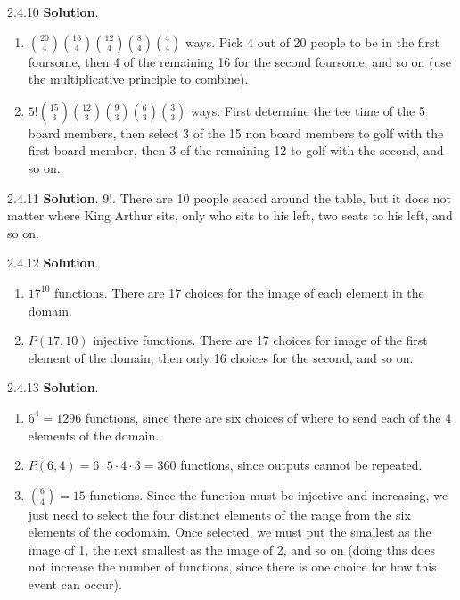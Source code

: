 \documentclass[11pt,]{book}
\theoremstyle{ptxplainnotitle}
\theoremstyle{ptxplaintitle}
\theoremstyle{ptxdefinitionnotitle}
\theoremstyle{ptxdefinitiontitle}
\theoremstyle{ptxdefinitionnotitle}
\theoremstyle{ptxdefinitiontitle}
\theoremstyle{ptxdefinitionnotitle}
\theoremstyle{ptxdefinitiontitle}
\theoremstyle{ptxdefinitiontitlenonumber}
\theoremstyle{ptxdefinitiontitlenonumber}
\numberwithin{equation}{chapter}
\begin{document}
\begin{divisionexercise}{2.4.10}
\textbf{Solution}.\quad%
\hypertarget{p-1595}{}%
\leavevmode%
\begin{enumerate}[label=\alph*.]
\item\hypertarget{li-669}{}\hypertarget{p-1596}{}%
\({20 \choose 4}{16 \choose 4}{12 \choose 4}{8 \choose 4}{4 \choose 4}\) ways. Pick 4 out of 20 people to be in the first foursome, then 4 of the remaining 16 for the second foursome, and so on (use the multiplicative principle to combine).%
\item\hypertarget{li-670}{}\hypertarget{p-1597}{}%
\(5!{15 \choose 3}{12 \choose 3}{9 \choose 3}{6 \choose 3}{3 \choose 3}\) ways. First determine the tee time of the 5 board members, then select 3 of the 15 non board members to golf with the first board member, then 3 of the remaining 12 to golf with the second, and so on.%
\end{enumerate}
%
\end{divisionexercise}%
\begin{divisionexercise}{2.4.11}
\textbf{Solution}.\quad%
\hypertarget{p-1603}{}%
\(9!\text{.}\) There are 10 people seated around the table, but it does not matter where King Arthur sits, only who sits to his left, two seats to his left, and so on.%
\end{divisionexercise}%
\begin{divisionexercise}{2.4.12}
\textbf{Solution}.\quad%
\hypertarget{p-1617}{}%
\leavevmode%
\begin{enumerate}[label=\alph*.]
\item\hypertarget{li-677}{}\hypertarget{p-1618}{}%
\(17^{10}\) functions.  There are 17 choices for the image of each element in the domain.%
\item\hypertarget{li-678}{}\hypertarget{p-1619}{}%
\(P(17, 10)\) injective functions.  There are 17 choices for image of the first element of the domain, then only 16 choices for the second, and so on.%
\end{enumerate}
%
\end{divisionexercise}%
\begin{divisionexercise}{2.4.13}
\textbf{Solution}.\quad%
\hypertarget{p-1634}{}%
\leavevmode%
\begin{enumerate}[label=\alph*.]
\item\hypertarget{li-685}{}\hypertarget{p-1635}{}%
\(6^4 = 1296\) functions, since there are six choices of where to send each of the 4 elements of the domain.%
\item\hypertarget{li-686}{}\hypertarget{p-1636}{}%
\(P(6, 4) = 6 \cdot 5 \cdot 4 \cdot 3 = 360\) functions, since outputs cannot be repeated.%
\item\hypertarget{li-687}{}\hypertarget{p-1637}{}%
\({6 \choose 4} = 15\) functions. Since the function must be injective and increasing, we just need to select the four distinct elements of the range from the six elements of the codomain.  Once selected, we must put the smallest as the image of 1, the next smallest as  the image of 2, and so on (doing this does not increase the number of functions, since there is one choice for how this event can occur).%
\end{enumerate}
%
\end{divisionexercise}%
\end{document}
